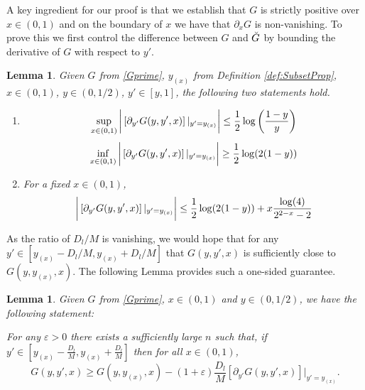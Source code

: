 \documentclass[12pt,reqno]{amsart}
\numberwithin{equation}{section}
\newtheorem{lemma}[theorem]{Lemma}
\theoremstyle{definition}
\renewcommand{\epsilon}{\varepsilon}
\renewcommand{\[}{\begin{equation}}
\renewcommand{\]}{\end{equation}}
\renewcommand{\|}{\bigg{|}}
\begin{document}
A key ingredient for our proof is that we establish that $G$ is strictly positive over $x \in (0,1)$ and on the boundary of $x$ we have that $\partial_xG$ is non-vanishing. To prove this we first control the difference between $G$ and $\Breve{G}$ by bounding the derivative of $G$ with respect to $y'$.

\begin{lemma}\label{DerPrime}
Given $G$ from \eqref{Gprime}, $y_{(x)}$ from Definition \ref{def:SubsetProp}, $x \in (0,1)$, $y \in (0,1/2)$, $y' \in [y,1]$, the following two statements hold.

\begin{enumerate}
    \item \[\sup_{x \in (0,1)} \bigg{|}\left[ \partial_{y'}G(y, y', x)\right]|_{y'=y_{(x)}}\bigg{|} \leq \frac{1}{2}\log\left(\frac{1-y }{y}\right)\]
    \[\inf_{x \in (0,1)} \bigg{|}\left[ \partial_{y'}G(y, y', x)\right]|_{y'=y_{(x)}}\bigg{|} \geq \frac{1}{2}\log(2(1-y))\]
    \item For a fixed $x \in (0,1)$,
\[\bigg{|}\left[\partial_{y'}G(y, y', x)\right]|_{y'=y_{(x)}}\bigg{|} \leq \frac{1}{2}\log(2(1-y)) + x\frac{\log(4)}{2^{2-x} - 2}\]
\end{enumerate}
\end{lemma}

As the ratio of $D_l/M$ is vanishing, we would hope that for any $y' \in [y_{(x)} - D_l/M, y_{(x)} + D_l/M]$ that $G(y, y', x)$ is sufficiently close to $G(y, y_{(x)}, x)$. The following Lemma provides such a one-sided guarantee.

\begin{lemma}\label{lem:justifyLowerGamma'}
    Given $G$ from \eqref{Gprime}, $x \in (0,1)$ and $y \in (0,1/2)$, we have the following statement:

    For any $\epsilon > 0$ there exists a sufficiently large $n$ such that, if $y' \in [y_{(x)} - \frac{D_l}{M}, y_{(x)} + \frac{D_l}{M}]$ then for all $x \in (0,1)$,
    \[G(y, y', x) \geq G(y, y_{(x)}, x) - (1+\epsilon)\frac{D_l}{M}[\partial_{y'}G(y, y', x)]|_{y' = y_{(x)}}.\]
\end{lemma}
\end{document}

